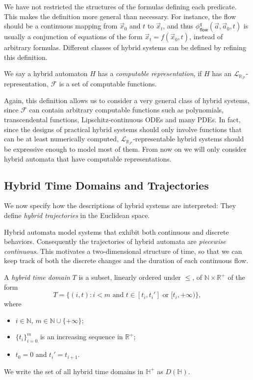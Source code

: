 \documentclass[envcountsect]{llncs}
\newcommand{\flow}{\mathsf{flow}}
\newcommand{\lrf}{\mathcal{L}_{\mathbb{R}_{\mathcal{F}}}}
\begin{document}
\begin{remark}
We have not restricted the structures of the formulas defining each
predicate. This makes the definition more general
than necessary. For instance, the flow should be a continuous mapping from $\vec
x_0$ and $t$ to $\vec x_t$, and thus $\phi^q_{\flow}(\vec a,
\vec a_0, t)$ is usually a conjunction of equations of the form $\vec x_t =
f(\vec x_0, t)$, instead of arbitrary formulas. Different classes of hybrid
systems can be defined by refining this definition.  
\end{remark}

\begin{definition}
We say a hybrid automaton $H$ has a {\em computable representation}, if $H$ has 
an $\lrf$-representation, $\mathcal{F}$ is a set of computable functions. 
\end{definition}

Again, this definition allows us to consider a very general class of hybrid
systems, since $\mathcal{F}$ can contain arbitrary computable functions such as 
polynomials, transcendental functions, Lipschitz-continuous ODEs and many PDEs.
In fact, since the designs of practical hybrid systems should only involve
functions that can be at least numerically computed, $\lrf$-representable hybrid
systems should be expressive enough to model most of them. From now on we will
only consider hybrid automata that have computable representations. 

\subsection{Hybrid Time Domains and Trajectories}

We now specify how the descriptions of hybrid systems are interpreted: They
define  {\em hybrid trajectories} in the Euclidean space. 

Hybrid automata model systems that exhibit both continuous and discrete
behaviors.  Consequently the trajectories of hybrid automata are {\em piecewise
continuous}. This motivates a two-dimensional structure of time, so that we can
keep track of both the discrete changes and the duration of each continuous
flow.  
\begin{definition}
A {\em hybrid time domain} $T$ is a subset, linearly ordered under $\leq$, of
 $\mathbb{N}\times \mathbb{R}^+$ of the form
$$T=\{(i, t): i<m \mbox{ and } t\in [t_i, t_i']\mbox{ or }[t_i, +\infty)\},$$ 
where%
\begin{itemize}
 \item $i\in \mathbb{N}$, $m\in \mathbb{N}\cup\{+\infty\}$; 
  \item $\{t_i\}_{i=0}^m$ is an increasing sequence in $\mathbb{R}^+$; 
 \item $t_0= 0$ and $t_i'=t_{i+1}$.
 \end{itemize} 
We write the set of all hybrid time domains in $\mathbb{H}^+$ as $D(\mathbb{H})$.
\end{definition}
\end{document}
